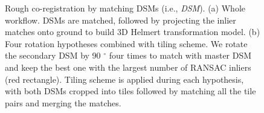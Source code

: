 \begin{figure}[htbp]
    \begin{center}
        \caption{Rough co-registration by matching \ac{DSM}s (i.e., \textit{DSM}). (a) Whole workflow. \ac{DSM}s are matched, followed by projecting the inlier matches onto ground to build 3D Helmert transformation model. (b) Four rotation hypotheses combined with tiling scheme. We rotate the secondary \ac{DSM} by 90 $^\circ$ four times to match with master \ac{DSM} and keep the best one with the largest number of RANSAC inliers (red rectangle). Tiling scheme is applied during each hypothesis, with both \ac{DSM}s cropped into tiles followed by matching all the tile pairs and merging the matches.}
        \label{WorkflowDSM}
    \end{center}
\end{figure}

